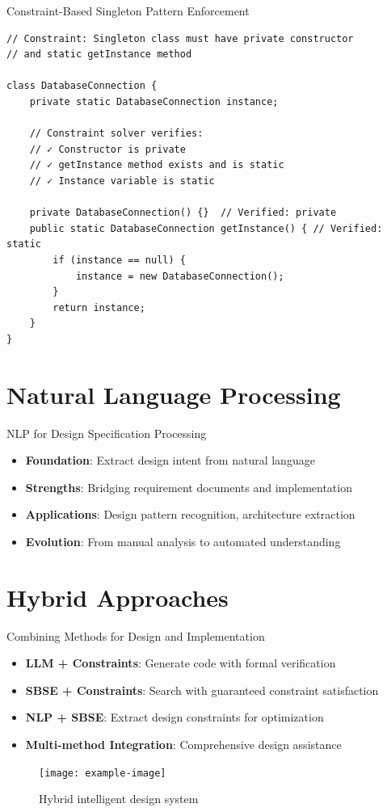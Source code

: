 \documentclass{beamer}
\begin{document}
\begin{frame}[fragile,t]{Constraint-Based Singleton Pattern Enforcement}
\begin{verbatim}
// Constraint: Singleton class must have private constructor
// and static getInstance method

class DatabaseConnection {
    private static DatabaseConnection instance;
    
    // Constraint solver verifies:
    // ✓ Constructor is private
    // ✓ getInstance method exists and is static
    // ✓ Instance variable is static
    
    private DatabaseConnection() {}  // Verified: private
    public static DatabaseConnection getInstance() { // Verified: static
        if (instance == null) {
            instance = new DatabaseConnection();
        }
        return instance;
    }
}
\end{verbatim}
\end{frame}

\section{Natural Language Processing}
\begin{frame}[t]{NLP for Design Specification Processing}
\begin{itemize}
\item \textbf{Foundation}: Extract design intent from natural language
\item \textbf{Strengths}: Bridging requirement documents and implementation
\item \textbf{Applications}: Design pattern recognition, architecture extraction
\item \textbf{Evolution}: From manual analysis to automated understanding
\end{itemize}
\end{frame}

\section{Hybrid Approaches}
\begin{frame}[t]{Combining Methods for Design and Implementation}
\begin{itemize}
\item \textbf{LLM + Constraints}: Generate code with formal verification
\item \textbf{SBSE + Constraints}: Search with guaranteed constraint satisfaction
\item \textbf{NLP + SBSE}: Extract design constraints for optimization
\item \textbf{Multi-method Integration}: Comprehensive design assistance
\end{itemize}
\begin{figure}
\texttt{[image: example-image]}
\caption{Hybrid intelligent design system}
\end{figure}
\end{frame}
\end{document}
